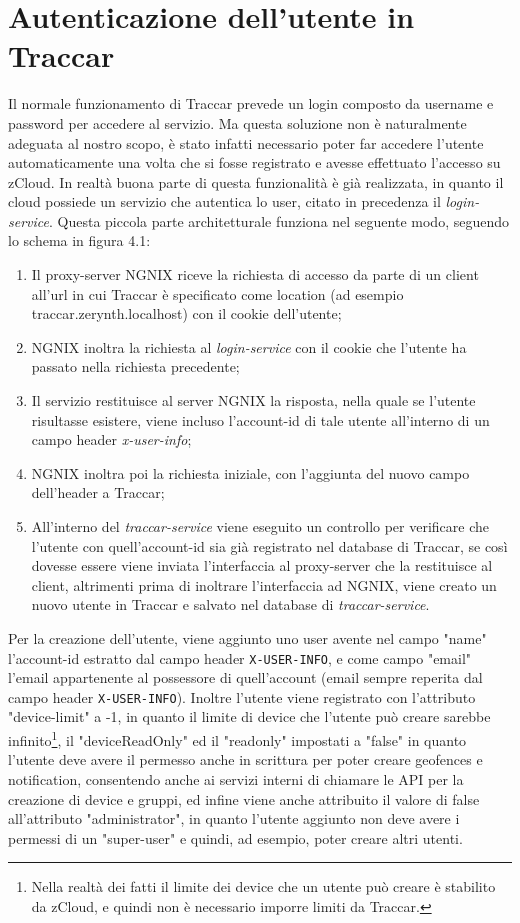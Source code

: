 \documentclass[a4paper,titlepage,12pt]{report}
\begin{document}
{\section{
Autenticazione dell'utente in Traccar}
Il normale funzionamento di Traccar prevede un login composto da username e password per accedere al servizio. Ma questa soluzione non è naturalmente adeguata al nostro scopo, è stato infatti necessario poter far accedere l'utente automaticamente una volta che si fosse registrato e avesse effettuato l'accesso su zCloud. In realtà buona parte di questa funzionalità è già realizzata, in quanto il cloud possiede un servizio che autentica lo user, citato in precedenza il \textit{login-service}. Questa piccola parte architetturale funziona nel seguente modo, seguendo lo schema in figura 4.1:\\
\begin{enumerate}
\item Il proxy-server NGNIX riceve la richiesta di accesso da parte di un client all'url in cui Traccar è specificato come location (ad esempio traccar.zerynth.localhost) con il cookie dell'utente;
\item NGNIX inoltra la richiesta al \textit{login-service} con il cookie che l'utente ha passato nella richiesta precedente;
\item Il servizio restituisce al server NGNIX la risposta, nella quale se l'utente risultasse esistere, viene incluso l'account-id di tale utente all'interno di un campo header \textit{x-user-info};
\item NGNIX inoltra poi la richiesta iniziale, con l'aggiunta del nuovo campo dell'header a Traccar;

\item All'interno del \textit{traccar-service} viene eseguito un controllo per verificare che l'utente con quell'account-id sia già registrato nel database di Traccar, se così dovesse essere viene inviata l'interfaccia al proxy-server che la restituisce al client, altrimenti prima di inoltrare l'interfaccia ad NGNIX, viene creato un nuovo utente in Traccar e salvato nel database di \textit{traccar-service}. 
\end{enumerate}

Per la creazione dell'utente, viene aggiunto uno user avente nel campo "name" l'account-id estratto dal campo header \texttt{X-USER-INFO}, e come campo "email" l'email appartenente al possessore di quell'account (email sempre reperita dal campo header \texttt{X-USER-INFO}). Inoltre l'utente viene registrato con l'attributo "device-limit" a -1, in quanto il limite di device che l'utente può creare sarebbe infinito\footnote{Nella realtà dei fatti il limite dei device che un utente può creare è stabilito da zCloud, e quindi non è necessario imporre limiti da Traccar.}, il "deviceReadOnly" ed il "readonly" impostati a "false" in quanto l'utente deve avere il permesso anche in scrittura per poter creare geofences e notification, consentendo anche ai servizi interni di chiamare le API per la creazione di device e gruppi, ed infine viene anche attribuito il valore di false all'attributo "administrator", in quanto l'utente aggiunto non deve avere i permessi di un "super-user" e quindi, ad esempio, poter creare altri utenti.


}
\end{document}

